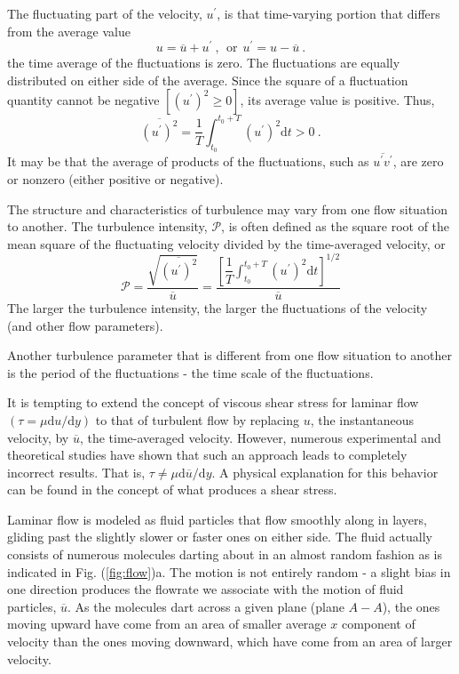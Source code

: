\documentclass[12pt,a4paper]{article}
\newcommand{\dif}{\mathrm{d}}
\newcounter{theo}[section]\setcounter{theo}{0}
\begin{document}
The fluctuating part of the velocity, $u^\prime$, is that time-varying portion that differs from the average value
\begin{equation}
u = \overline{u} + u^\prime ~, ~~ \text{or} ~~ u^\prime = u - \overline{u} ~.
\end{equation}
the time average of the fluctuations is zero. The fluctuations are equally distributed on either side of the average. Since the square of a fluctuation quantity cannot be negative $[(u^\prime)^2 \geqslant 0]$, its average value is positive. Thus,
\begin{equation}
\overline{(u^\prime)^2} =  \dfrac{1}{T} \int_{t_0}^{t_0 +T} (u^\prime)^2 \dif t  > 0 ~.
\end{equation}
It may be that the average of products of the fluctuations, such as $\overline{u^\prime v^\prime}$, are zero or nonzero (either positive or negative).

The structure and characteristics of turbulence may vary from one flow situation to another. The turbulence intensity, $\mathscr P$, is often defined as the square root of the mean square of the fluctuating velocity divided by the time-averaged velocity, or
\begin{equation}
\mathscr P = \dfrac{\sqrt{\overline{(u^\prime)^2}}}{\overline{u}} = \dfrac{\left[ \dfrac{1}{T} \int_{t_0}^{t_0 +T} (u^\prime)^2 \dif t \right]^{1/2}}{\overline{u}}
\end{equation}
The larger the turbulence intensity, the larger the fluctuations of the velocity (and other flow parameters).

Another turbulence parameter that is different from one flow situation to another is the period of the fluctuations - the time scale of the fluctuations. 

It is tempting to extend the concept of viscous shear stress for laminar flow $(\tau = \mu \dif u/ \dif y)$ to that of turbulent flow by replacing $u$, the instantaneous velocity, by $\overline{u}$, the time-averaged velocity. However, numerous experimental and theoretical studies have shown that such an approach leads to completely incorrect results. That is, $\tau \neq \mu \dif \overline{u}/\dif y$. A physical explanation for this behavior can be found in the concept of what produces a shear stress.

Laminar flow is modeled as fluid particles that flow smoothly along in layers, gliding past the slightly slower or faster ones on either side. The fluid actually consists of numerous molecules darting about in an almost random fashion as is indicated in Fig. (\ref{fig:flow})a. The motion is not entirely random - a slight bias in one direction produces the flowrate we associate with the motion of fluid particles, $\overline{u}$. As the molecules dart across a given plane (plane $A-A$), the ones moving upward have come from an area of smaller average $x$ component of velocity than the ones moving downward, which have come from an area of larger velocity.
\end{document}
